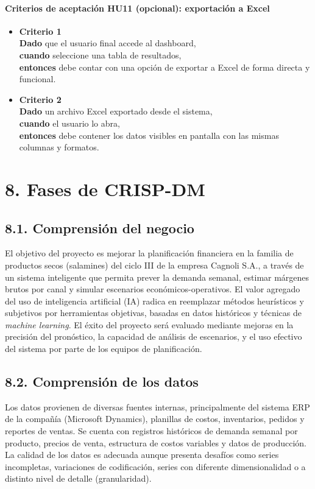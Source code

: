 \documentclass[
11pt, %
]{charter}
\begin{document}
\vspace{1em}

\paragraph{Criterios de aceptación HU11 (opcional): exportación a Excel}
\begin{itemize}
  \item \textbf{Criterio 1} \\
  \textbf{Dado} que el usuario final accede al dashboard, \\
  \textbf{cuando} seleccione una tabla de resultados, \\
  \textbf{entonces} debe contar con una opción de exportar a Excel de forma directa y funcional.

  \item \textbf{Criterio 2} \\
  \textbf{Dado} un archivo Excel exportado desde el sistema, \\
  \textbf{cuando} el usuario lo abra, \\
  \textbf{entonces} debe contener los datos visibles en pantalla con las mismas columnas y formatos.
\end{itemize}

\newpage

\section{8. Fases de CRISP-DM}

\subsection*{8.1. Comprensión del negocio}
El objetivo del proyecto es mejorar la planificación financiera en la familia de productos secos (salamines) del ciclo III de la empresa Cagnoli S.A., a través de un sistema inteligente que permita prever la demanda semanal, estimar márgenes brutos por canal y simular escenarios económicos-operativos. El valor agregado del uso de inteligencia artificial (IA) radica en reemplazar métodos heurísticos y subjetivos por herramientas objetivas, basadas en datos históricos y técnicas de \textit{machine learning}. 
El éxito del proyecto será evaluado mediante mejoras en la precisión del pronóstico, la capacidad de análisis de escenarios, y el uso efectivo del sistema por parte de los equipos de planificación.

\subsection*{8.2. Comprensión de los datos}
Los datos provienen de diversas fuentes internas, principalmente del sistema ERP de la compañía (Microsoft Dynamics), planillas de costos, inventarios, pedidos y reportes de ventas. Se cuenta con registros históricos de demanda semanal por producto, precios de venta, estructura de costos variables y datos de producción. La calidad de los datos es adecuada aunque presenta desafíos como series incompletas, variaciones de codificación, series con diferente dimensionalidad o a distinto nivel de detalle (granularidad).
\end{document}
